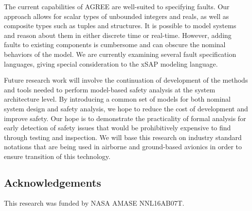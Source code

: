 The current capabilities of AGREE are well-suited to specifying faults.  Our approach allows for scalar types of unbounded integers and reals, as well as composite types such as tuples and structures.  It is possible to model systems and reason about them in either discrete time or real-time.  However, adding faults to existing components is cumbersome and can obscure the nominal behaviors of the model.  We are currently examining several fault specification languages, giving special consideration to the xSAP modeling language.

Future research work will involve the continuation of development of the methods and tools needed to perform model-based safety analysis at the system architecture level. By introducing a common set of models for both nominal system design and safety analysis, we hope to reduce the cost of development and improve safety. Our hope is to demonstrate the practicality of formal analysis for early detection of safety issues that would be prohibitively expensive to find through testing and inspection. We will base this research on industry standard notations that are being used in airborne and ground-based avionics in order to ensure transition of this technology.

\subsection*{Acknowledgements} This research was funded by NASA AMASE NNL16AB07T.


